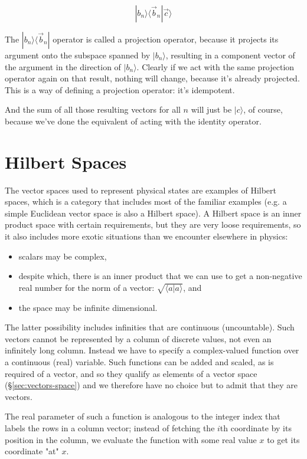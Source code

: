 $$|b_n \rangle \langle \vec{b}_n | \vec{c} \rangle$$

The $|b_n \rangle \langle \vec{b}_n|$ operator is called a projection operator, because it projects its argument onto the subspace spanned by $|b_n \rangle$, resulting in a component vector of the argument in the direction of $|b_n \rangle$. Clearly if we act with the same projection operator again on that result, nothing will change, because it's already projected. This is a way of defining a projection operator: it's idempotent.

And the sum of all those resulting vectors for all $n$ will just be $|c \rangle$, of course, because we've done the equivalent of acting with the identity operator.

\section{Hilbert Spaces}

The vector spaces used to represent physical states are examples of Hilbert spaces, which is a category that includes most of the familiar examples (e.g. a simple Euclidean vector space is also a Hilbert space). A Hilbert space is an inner product space with certain requirements, but they are very loose requirements, so it also includes more exotic situations than we encounter elsewhere in physics:

\begin{itemize}
  \item scalars may be complex,
  \item despite which, there is an inner product that we can use to get a non-negative real number for the norm of a vector: $\sqrt{\langle a|a \rangle}$, and 
  \item the space may be infinite dimensional.
\end{itemize}

The latter possibility includes infinities that are continuous (uncountable). Such vectors cannot be represented by a column of discrete values, not even an infinitely long column. Instead we have to specify a complex-valued function over a continuous (real) variable. Such functions can be added and scaled, as is required of a vector, and so they qualify as elements of a vector space (§\ref{sec:vectors-space}) and we therefore have no choice but to admit that they are vectors.

The real parameter of such a function is analogous to the integer index that labels the rows in a column vector; instead of fetching the $i$th coordinate by its position in the column, we evaluate the function with some real value $x$ to get its coordinate "at" $x$.

